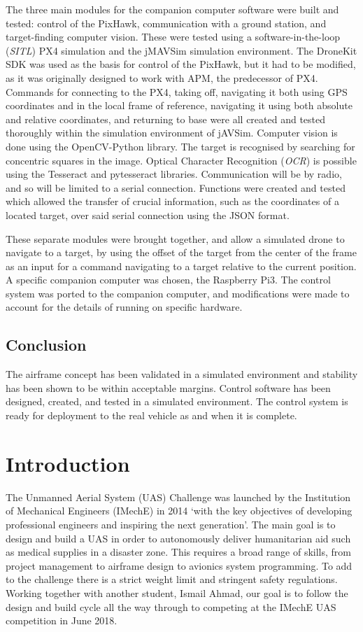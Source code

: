 \documentclass[11pt,twoside]{article}
\begin{document}
The three main modules for the companion computer software were built and tested: control of the PixHawk, communication with a ground station, and target-finding computer vision.
These were tested using a software-in-the-loop (\emph{SITL}) PX4 simulation and the jMAVSim simulation environment. The DroneKit SDK was used as the basis for control of the PixHawk, but it had to be modified, as it was originally designed to work with APM, the predecessor of PX4\cite{dronekit}. Commands for connecting to the PX4, taking off, navigating it both using GPS coordinates and in the local frame of reference, navigating it using both absolute and relative coordinates, and returning to base were all created and tested thoroughly within the simulation environment of jAVSim. Computer vision is done using the OpenCV-Python library. The target is recognised by searching for concentric squares in the image. Optical Character Recognition (\emph{OCR}) is possible using the Tesseract and pytesseract libraries. Communication will be by radio, and so will be limited to a serial connection. Functions were created and tested which allowed the transfer of crucial information, such as the coordinates of a located target, over said serial connection using the JSON format.

These separate modules were brought together, and allow a simulated drone to navigate to a target, by using the offset of the target from the center of the frame as an input for a command navigating to a target relative to the current position. A specific companion computer was chosen, the Raspberry Pi3. The control system was ported to the companion computer, and modifications were made to account for the details of running on specific hardware.

\subsection*{Conclusion}
The airframe concept has been validated in a simulated environment and stability has been shown to be within acceptable margins. Control software has been designed, created, and tested in a simulated environment. The control system is ready for deployment to the real vehicle as and when it is complete.


\section{Introduction}
The Unmanned Aerial System (UAS) Challenge was launched by the Institution of Mechanical Engineers (IMechE) in 2014 `with the key objectives of developing professional engineers and inspiring the next generation'\cite{IMechE_about_uas}. The main goal is to design and build a UAS in order to autonomously deliver humanitarian aid such as medical supplies in a disaster zone. This requires a broad range of skills, from project management to airframe design to avionics system programming. To add to the challenge there is a strict weight limit and stringent safety regulations. Working together with another student, Ismail Ahmad, our goal is to follow the design and build cycle all the way through to competing at the IMechE UAS competition in June 2018.
\end{document}
